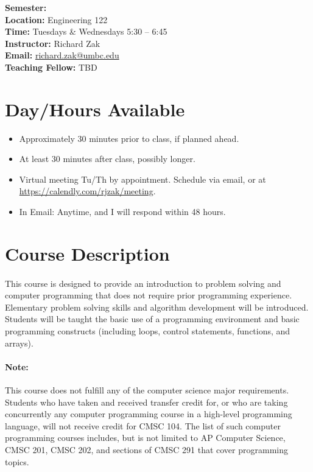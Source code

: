 \documentclass[letter,10pt]{article}
\begin{document}
\textbf{Semester:} \\
\textbf{Location:} Engineering 122 \\
\textbf{Time:} Tuesdays \& Wednesdays 5:30 -- 6:45 \\
\textbf{Instructor:} Richard Zak \\
\textbf{Email:} \href{mailto:richard.zak@umbc.edu?Subject=CMSC104}{richard.zak@umbc.edu} \\
\textbf{Teaching Fellow:} TBD \\

\section*{Day/Hours Available}
\begin{itemize}
\item Approximately 30 minutes prior to class, if planned ahead.
\item At least 30 minutes after class, possibly longer.
\item Virtual meeting Tu/Th by appointment. Schedule via email, or at \url{https://calendly.com/rjzak/meeting}.
\item In Email: Anytime, and I will respond within 48 hours.
\end{itemize}

\section*{Course Description}
\paragraph{}This course is designed to provide an introduction to problem solving and computer programming that does not require prior programming experience. Elementary problem solving skills and algorithm development will be introduced. Students will be taught the basic use of a programming environment and basic programming constructs (including loops, control statements, functions, and arrays).

\paragraph{Note:}This course does not fulfill any of the computer science major requirements. Students who have taken and received transfer credit for, or who are taking concurrently any computer programming course in a high-level programming language, will not receive credit for CMSC 104. The list of such computer programming courses includes, but is not limited to AP Computer Science, CMSC 201, CMSC 202, and sections of CMSC 291 that cover programming topics.
\end{document}
